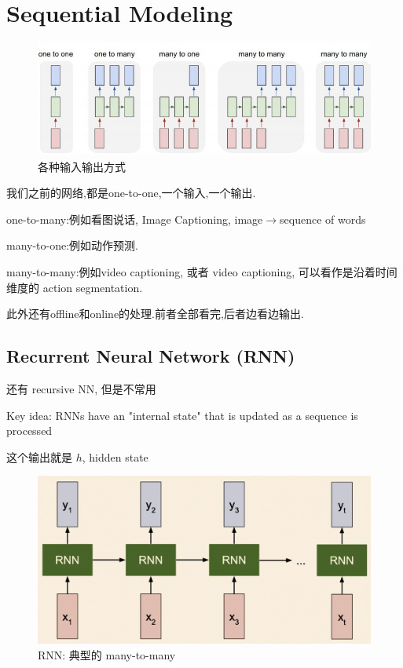 \section{Sequential Modeling}

	\begin{figure}[htbp]
		\centering
		\includegraphics[scale=0.65]{figures/rnn-seqdata.png}
		\caption{各种输入输出方式}
	\end{figure}

	我们之前的网络,都是one-to-one,一个输入,一个输出.
	
	one-to-many:例如看图说话, Image Captioning, image$\rightarrow$sequence of words
	
	many-to-one:例如动作预测.
	
	many-to-many:例如video captioning, 或者 video captioning, 可以看作是沿着时间维度的 action segmentation.

	此外还有offline和online的处理.前者全部看完,后者边看边输出.
	
	\subsection{Recurrent Neural Network (RNN)}
	
	还有 recursive NN, 但是不常用

	Key idea: RNNs have an "internal state" that is updated as a sequence is processed

	这个输出就是 $h$, hidden state

	\begin{figure}[htbp]
		\centering
		\includegraphics[scale=0.3]{figures/rnn.png}
		\caption{RNN: 典型的 many-to-many}
	\end{figure}

